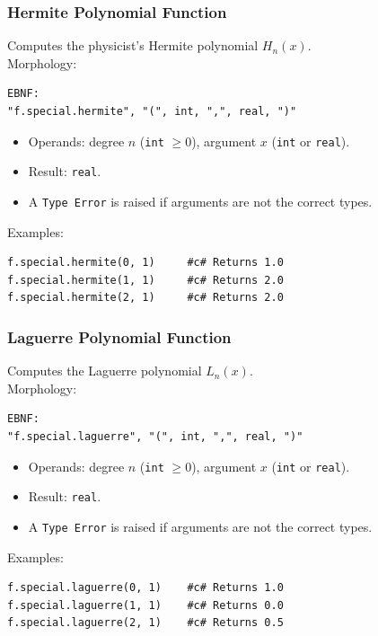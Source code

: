 \subsubsection{Hermite Polynomial Function}
Computes the physicist's Hermite polynomial $H_n(x)$. \\
Morphology:
\begin{verbatim}
EBNF:
"f.special.hermite", "(", int, ",", real, ")"
\end{verbatim}
\begin{itemize}
\item Operands: degree $n$ (\texttt{int} $\geq 0$), argument $x$ (\texttt{int} or \texttt{real}).
\item Result: \texttt{real}.
\item A \texttt{Type Error} is raised if arguments are not the correct types.
\end{itemize}
Examples:
\begin{verbatim}
f.special.hermite(0, 1)     #c# Returns 1.0
f.special.hermite(1, 1)     #c# Returns 2.0
f.special.hermite(2, 1)     #c# Returns 2.0
\end{verbatim}

\subsubsection{Laguerre Polynomial Function}
Computes the Laguerre polynomial $L_n(x)$. \\
Morphology:
\begin{verbatim}
EBNF:
"f.special.laguerre", "(", int, ",", real, ")"
\end{verbatim}
\begin{itemize}
\item Operands: degree $n$ (\texttt{int} $\geq 0$), argument $x$ (\texttt{int} or \texttt{real}).
\item Result: \texttt{real}.
\item A \texttt{Type Error} is raised if arguments are not the correct types.
\end{itemize}
Examples:
\begin{verbatim}
f.special.laguerre(0, 1)    #c# Returns 1.0
f.special.laguerre(1, 1)    #c# Returns 0.0
f.special.laguerre(2, 1)    #c# Returns 0.5
\end{verbatim}

